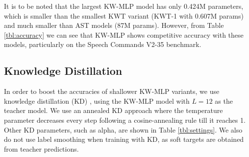 \documentclass{article} \usepackage{iclr2022_conference,times}
\begin{document}
It is to be noted that the largest KW-MLP model has only 0.424M parameters, which is smaller than the smallest KWT variant (KWT-1 with 0.607M params) and much smaller than AST models (87M params). However, from Table \ref{tbl:accuracy} we can see that KW-MLP shows competitive accuracy with these models, particularly on the Speech Commands V2-35 benchmark.

\subsection{Knowledge Distillation}
In order to boost the accuracies of shallower KW-MLP variants, we use knowledge distillation (KD) \citep{hinton2015distilling}, using the KW-MLP model with $L = 12$ as the teacher model. We use an annealed KD approach \citep{jafari2021annealing} where the temperature parameter decreases every step following a cosine-annealing rule till it reaches 1. Other KD parameters, such as alpha, are shown in Table \ref{tbl:settings}. We also do not use label smoothing when training with KD, as soft targets are obtained from teacher predictions.
\end{document}
